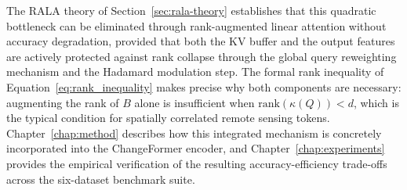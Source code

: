 The \ac{RALA} theory of Section~\ref{sec:rala-theory} establishes that this quadratic bottleneck can be eliminated through rank-augmented linear attention without accuracy degradation, provided that both the \ac{KV} buffer and the output features are actively protected against rank collapse through the global query reweighting mechanism and the Hadamard modulation step. The formal rank inequality of Equation~\ref{eq:rank_inequality} makes precise why both components are necessary: augmenting the rank of $B$ alone is insufficient when $\mathrm{rank}(\kappa(Q)) < d$, which is the typical condition for spatially correlated remote sensing tokens. Chapter~\ref{chap:method} describes how this integrated mechanism is concretely incorporated into the ChangeFormer encoder, and Chapter~\ref{chap:experiments} provides the empirical verification of the resulting accuracy-efficiency trade-offs across the six-dataset benchmark suite.